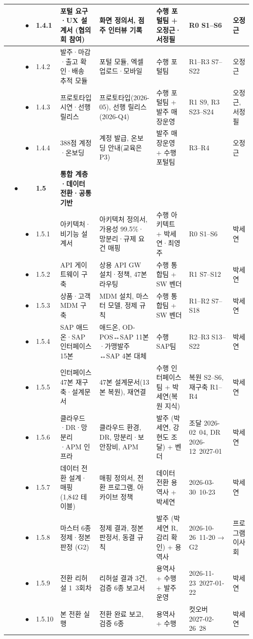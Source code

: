 \documentclass[10pt,a4paper]{article}
\begin{document}
{\begin{longtable}{|C{7mm}|C{7mm}|C{7mm}|L{12mm}|L{52mm}|L{52mm}|L{44mm}|L{30mm}|L{28mm}|}
& & ● & 1.4.1 & 포털 요구·UX 설계서 (협의회 참여) & 화면 정의서, 점주 인터뷰 기록 & 수행 포털팀 + 오정근·서정필 & R0 S1–S6 & 오정근 \\ \hline
& & ● & 1.4.2 & 발주·마감·출고 확인·배송 추적 모듈 & 포털 모듈, 엑셀 업로드·모바일 & 수행 포털팀 & R1–R3 S7–S22 & 오정근 \\ \hline
& & ● & 1.4.3 & 프로토타입 시연·선행 릴리스 & 프로토타입(2026-05), 선행 릴리스(2026-Q4) & 수행 포털팀 + 발주 매장운영 & R1 S9, R3 S23–S24 & 오정근, 서정필 \\ \hline
& & ● & 1.4.4 & 388점 계정·온보딩 & 계정 발급, 온보딩 안내(교육은 P3) & 발주 매장운영 + 수행 포털팀 & R3–R4 & 오정근 \\ \hline
& ● & & \textbf{1.5} & \textbf{통합 계층·데이터 전환·공통 기반} & & & & \\ \hline
& & ● & 1.5.1 & 아키텍처·비기능 설계서 & 아키텍처 정의서, 가용성 99.5\%·망분리·규제 요건 매핑 & 수행 아키텍트 + 박세연·최영주 & R0 S1–S6 & 박세연 \\ \hline
& & ● & 1.5.2 & API 게이트웨이 구축 & 상용 API GW 설치·정책, 47본 라우팅 & 수행 통합팀 + SW 벤더 & R1 S7–S12 & 박세연 \\ \hline
& & ● & 1.5.3 & 상품·고객 MDM 구축 & MDM 설치, 마스터 모델, 정제 규칙 & 수행 통합팀 + SW 벤더 & R1–R2 S7–S18 & 박세연 \\ \hline
& & ● & 1.5.4 & SAP 애드온·SAP 인터페이스 15본 & 애드온, OD-POS↔SAP 11본·가맹발주↔SAP 4본 대체 & 수행 SAP팀 & R2–R3 S13–S22 & 박세연 \\ \hline
& & ● & 1.5.5 & 인터페이스 47본 재구축·설계문서 & 47본 설계문서(13본 복원), 재연결 & 수행 인터페이스팀 + 박세연(복원 지식) & 복원 S2–S6, 재구축 R1–R4 & 박세연 \\ \hline
& & ● & 1.5.6 & 클라우드·DR·망분리·APM 인프라 & 클라우드 환경, DR, 망분리·보안장비, APM & 발주 (박세연, 강현도 조달) + 벤더 & 조달 2026-02~04, DR 2026-12~2027-01 & 박세연 \\ \hline
& & ● & 1.5.7 & 데이터 전환 설계·매핑 (1,842 테이블) & 매핑 정의서, 전환 프로그램, 아카이브 정책 & 데이터 전환 용역사 + 박세연 & 2026-03-30~10-23 & 박세연 \\ \hline
& & ● & 1.5.8 & 마스터 6종 정제·정본 판정 (G2) & 정제 결과, 정본 판정서, 동결 규칙 & 발주 (박세연 R, 감리 확인) + 용역사 & 2026-10-26~11-20 → G2 & 프로그램 이사회 \\ \hline
& & ● & 1.5.9 & 전환 리허설 1~3회차 & 리허설 결과 3건, 검증 6종 보고서 & 용역사 + 수행 + 발주 운영 & 2026-11-23~2027-01-22 & 박세연 \\ \hline
& & ● & 1.5.10 & 본 전환 실행 & 전환 완료 보고, 검증 6종 & 용역사 + 수행 & 컷오버 2027-02-26~28 & 박세연 \\ \hline

\end{longtable}}
\end{document}
